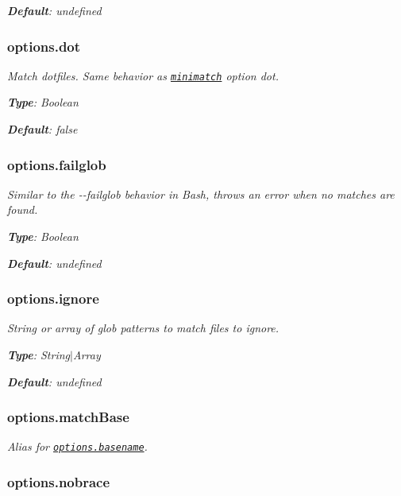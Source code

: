 {\itshape {\bfseries Default}\+: {\ttfamily undefined}}

{\itshape \subsubsection*{options.\+dot}}

{\itshape }

{\itshape Match dotfiles. Same behavior as \href{https://github.com/isaacs/minimatch}{\tt minimatch} option {\ttfamily dot}.}

{\itshape {\bfseries Type}\+: {\ttfamily Boolean}}

{\itshape {\bfseries Default}\+: {\ttfamily false}}

{\itshape \subsubsection*{options.\+failglob}}

{\itshape }

{\itshape Similar to the {\ttfamily -\/-\/failglob} behavior in Bash, throws an error when no matches are found.}

{\itshape {\bfseries Type}\+: {\ttfamily Boolean}}

{\itshape {\bfseries Default}\+: {\ttfamily undefined}}

{\itshape \subsubsection*{options.\+ignore}}

{\itshape }

{\itshape String or array of glob patterns to match files to ignore.}

{\itshape {\bfseries Type}\+: {\ttfamily String$\vert$\+Array}}

{\itshape {\bfseries Default}\+: {\ttfamily undefined}}

{\itshape \subsubsection*{options.\+match\+Base}}

{\itshape }

{\itshape Alias for \href{#options-basename}{\tt options.\+basename}.}

{\itshape \subsubsection*{options.\+nobrace}}

